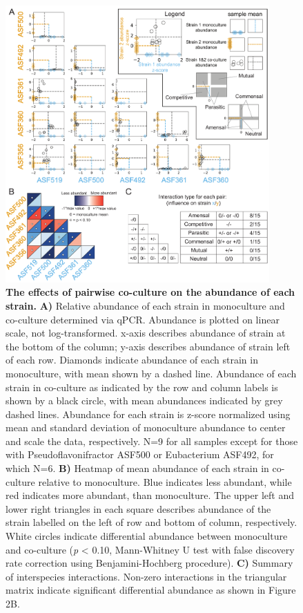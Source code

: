 \documentclass[11pt,twocolumn,notitlepage,openany,twoside]{book}
\begin{document}
\begin{refsection}
\begin{figure}
\centering
\includegraphics[width=0.9\textwidth]{ch2_fig2}
\caption[The effects of pairwise co-culture on the abundance of each strain.]{\textbf{The effects of pairwise co-culture on the abundance of each strain.} \textbf{A)} Relative abundance of each strain in monoculture and co-culture determined via qPCR. Abundance is plotted on linear scale, not log-transformed. x-axis describes abundance of strain at the bottom of the column; y-axis describes abundance of strain left of each row. Diamonds indicate abundance of each strain in monoculture, with mean shown by a dashed line. Abundance of each strain in co-culture as indicated by the row and column labels is shown by a black circle, with mean abundances indicated by grey dashed lines. Abundance for each strain is z-score normalized using mean and standard deviation of monoculture abundance to center and scale the data, respectively. N=9 for all samples except for those with Pseudoflavonifractor ASF500 or Eubacterium ASF492, for which N=6. \textbf{B)} Heatmap of mean abundance of each strain in co-culture relative to monoculture. Blue indicates less abundant, while red indicates more abundant, than monoculture. The upper left and lower right triangles in each square describes abundance of the strain labelled on the left of row and bottom of column, respectively. White circles indicate differential abundance between monoculture and co-culture (\textit{p} < 0.10, Mann-Whitney U test with false discovery rate correction using Benjamini-Hochberg procedure). \textbf{C)} Summary of interspecies interactions. Non-zero interactions in the triangular matrix indicate significant differential abundance as shown in Figure 2B.}
\end{figure}


\end{refsection}
\end{document}
